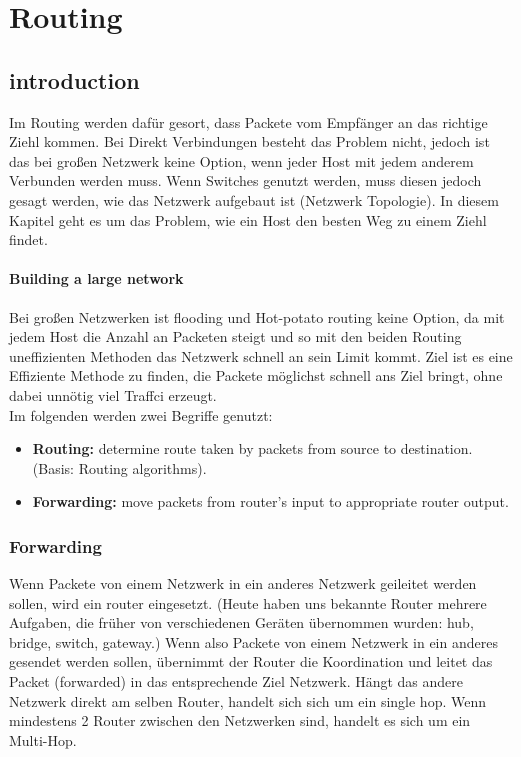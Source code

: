 \section{Routing} %
	\subsection{introduction}
		Im Routing werden dafür gesort, dass Packete vom Empfänger an das richtige Ziehl kommen. Bei Direkt Verbindungen besteht das Problem nicht, jedoch ist das bei großen Netzwerk keine Option, wenn jeder Host mit jedem anderem Verbunden werden muss. Wenn Switches genutzt werden, muss diesen jedoch gesagt werden, wie das Netzwerk aufgebaut ist (Netzwerk Topologie). In diesem Kapitel geht es um das Problem, wie ein Host den besten Weg zu einem Ziehl findet. 
		
		\paragraph{Building a large network}
			Bei großen Netzwerken ist flooding und Hot-potato routing keine Option, da mit jedem Host die Anzahl an Packeten steigt und so mit den beiden Routing uneffizienten Methoden das Netzwerk schnell an sein Limit kommt. Ziel ist es eine Effiziente Methode zu finden, die Packete möglichst schnell ans Ziel bringt, ohne dabei unnötig viel Traffci erzeugt. \\
			Im folgenden werden zwei Begriffe genutzt:
			\begin{itemize}
				\item \textbf{Routing:} determine route taken by packets from source to destination. (Basis: Routing algorithms). 
				\item \textbf{Forwarding:} move packets from router's input to appropriate router output. 
			\end{itemize}
			
		\subsubsection{Forwarding}
			Wenn Packete von einem Netzwerk in ein anderes Netzwerk geileitet werden sollen, wird ein router eingesetzt. (Heute haben uns bekannte Router mehrere Aufgaben, die früher von verschiedenen Geräten übernommen wurden: hub, bridge, switch, gateway.) Wenn also Packete von einem Netzwerk in ein anderes gesendet werden sollen, übernimmt der Router die Koordination und leitet das Packet (forwarded) in das entsprechende Ziel Netzwerk. Hängt das andere Netzwerk direkt am selben Router, handelt sich sich um ein single hop. Wenn mindestens 2 Router zwischen den Netzwerken sind, handelt es sich um ein Multi-Hop.
				
